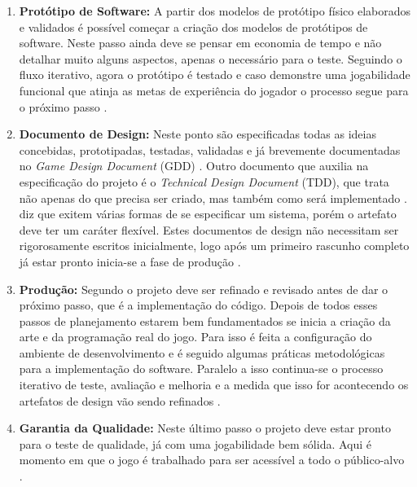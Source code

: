 \begin{enumerate}
    \item \textbf{Protótipo de Software:} A partir dos modelos de protótipo físico elaborados e validados é possível começar a criação dos modelos de protótipos de software. Neste passo ainda deve se pensar em economia de tempo e não detalhar muito alguns aspectos, apenas o necessário para o teste. Seguindo o fluxo iterativo, agora o protótipo é testado e caso demonstre uma jogabilidade funcional que atinja as metas de experiência do jogador o processo segue para o próximo passo \cite{Fullerton_2008}. %

    \item \textbf{Documento de Design:} Neste ponto são especificadas todas as ideias concebidas, prototipadas, testadas, validadas e já brevemente documentadas no \textit{Game Design Document} (GDD) \cite{Fullerton_2008}. Outro documento que auxilia na especificação do projeto é o \textit{Technical Design Document} (TDD), que trata não apenas do que precisa ser criado, mas também como será implementado \cite{Bethke_2003}. \citeauthor{Pressman_2000} diz que exitem várias formas de se especificar um sistema, porém o artefato deve ter um caráter flexível. Estes documentos de design não necessitam ser rigorosamente escritos inicialmente, logo após um primeiro rascunho completo já estar pronto inicia-se a fase de produção \cite{Fullerton_2008}. %


    \item \textbf{Produção:} Segundo  o projeto deve ser refinado e revisado antes de dar o próximo passo, que é a implementação do código. Depois de todos esses passos de planejamento estarem bem fundamentados se inicia a criação da arte e da programação real do jogo. Para isso é feita a configuração do ambiente de desenvolvimento e é seguido algumas práticas metodológicas para a implementação do software. Paralelo a isso continua-se o processo iterativo de teste, avaliação e melhoria e a medida que isso for acontecendo os artefatos de design vão sendo refinados \cite{Pressman_2000, Fullerton_2008}. 
    
    
    \item \textbf{Garantia da Qualidade:} Neste último passo o projeto deve estar pronto para o teste de qualidade, já com uma jogabilidade bem sólida. Aqui é momento em que o jogo é trabalhado para ser acessível a todo o público-alvo \cite{Fullerton_2008}. %
    
\end{enumerate}

